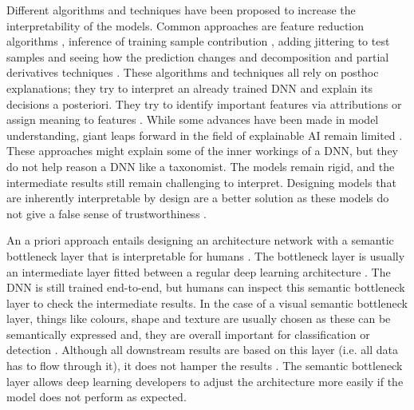 \documentclass[a4paper, 12pt, oneside]{book} %
\begin{document}
Different algorithms and techniques have been proposed to increase the interpretability of the models.
Common approaches are feature reduction algorithms \autocite{ribeiro_why_2016}, inference of training sample contribution \autocite{koh_understanding_2020}, adding jittering to test samples and seeing how the prediction changes \autocite{li_understanding_2017} and decomposition and partial derivatives techniques \autocite{samek_explainable_2017}.
These algorithms and techniques all rely on posthoc explanations; they try to interpret an already trained DNN and explain its decisions a posteriori.
They try to identify important features via attributions \autocite{zintgraf_visualizing_2017, selvaraju_grad-cam_2017} or assign meaning to features \autocite{fleet_visualizing_2014}.
While some advances have been made in model understanding, giant leaps forward in the field of explainable AI remain limited \autocite{lipton_mythos_2017, li_interpretable_2021}.
These approaches might explain some of the inner workings of a DNN, but they do not help reason a DNN like a taxonomist.
The models remain rigid, and the intermediate results still remain challenging to interpret.
Designing models that are inherently interpretable by design are a better solution as these models do not give a false sense of trustworthiness \autocite{rudin_stop_2019}.

An a priori approach entails designing an architecture network with a semantic bottleneck layer that is interpretable for humans \autocite{bucher_semantic_2019}. 
The bottleneck layer is usually an intermediate layer fitted between a regular deep learning architecture \autocite{bucher_semantic_2019}.
The DNN is still trained end-to-end, but humans can inspect this semantic bottleneck layer to check the intermediate results.
In the case of a visual semantic bottleneck layer, things like colours, shape and texture are usually chosen as these can be semantically expressed and, they are overall important for classification or detection \autocite{yosinski_understanding_2015, fleet_visualizing_2014}.
Although all downstream results are based on this layer (i.e. all data has to flow through it), it does not hamper the results \autocite{bucher_semantic_2019}.
The semantic bottleneck layer allows deep learning developers to adjust the architecture more easily if the model does not perform as expected.
\end{document}
